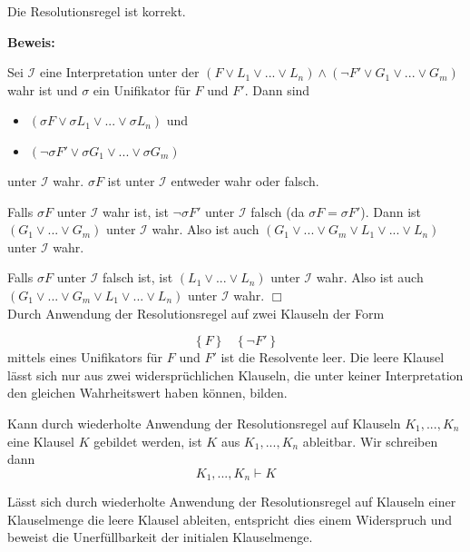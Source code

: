 \begin{leftbar}
\begin{satz}
  Die Resolutionsregel ist korrekt.
\end{satz}
\end{leftbar}
\noindent
\textbf{Beweis:}

Sei $\mathcal{I}$ eine Interpretation unter der $(F \vee L_1 \vee ... \vee L_n) \wedge (\neg F' \vee G_1 \vee ... \vee G_m)$ wahr ist und $\sigma$ ein Unifikator für $F$ und $F'$. Dann sind

\begin{itemize}
\item $(\sigma F \vee \sigma L_1 \vee ... \vee \sigma L_n)$ und
\item $(\neg \sigma F' \vee \sigma G_1 \vee ... \vee \sigma G_m)$
\end{itemize}
unter $\mathcal{I}$ wahr. $\sigma F$ ist unter $\mathcal{I}$ entweder wahr oder falsch.

Falls $\sigma F$ unter $\mathcal{I}$ wahr ist, ist $\neg \sigma F'$ unter $\mathcal{I}$ falsch (da $\sigma F = \sigma F'$). Dann ist $(G_1 \vee ... \vee G_m)$ unter $\mathcal{I}$ wahr. Also ist auch $(G_1 \vee ... \vee G_m \vee L_1 \vee ... \vee L_n)$ unter $\mathcal{I}$ wahr.

Falls $\sigma F$ unter $\mathcal{I}$ falsch ist, ist $(L_1 \vee ... \vee L_n)$ unter $\mathcal{I}$ wahr. Also ist auch $(G_1 \vee ... \vee G_m \vee L_1 \vee ... \vee L_n)$ unter $\mathcal{I}$ wahr.
\hfill $\Box$\\
\newline
\noindent
Durch Anwendung der Resolutionsregel auf zwei Klauseln der Form

\begin{equation}
  \left \{ F \right \} \; \; \; \left \{ \neg F' \right \}
\end{equation}
\noindent
mittels eines Unifikators für $F$ und $F'$ ist die Resolvente leer. Die leere Klausel lässt sich nur aus zwei widersprüchlichen Klauseln, die unter keiner Interpretation den gleichen Wahrheitswert haben können, bilden.

\begin{leftbar}
  \begin{definition}[Ableitbarkeit]
    \newline
    Kann durch wiederholte Anwendung der Resolutionsregel auf Klauseln $K_1,...,K_n$ eine Klausel $K$ gebildet werden, ist $K$ aus $K_1,...,K_n$ ableitbar. Wir schreiben dann
    \begin{equation}
      K_1,...,K_n \vdash K
    \end{equation}
  \end{definition}
\end{leftbar}
\noindent
Lässt sich durch wiederholte Anwendung der Resolutionsregel auf Klauseln einer Klauselmenge die leere Klausel ableiten, entspricht dies einem Widerspruch und beweist die Unerfüllbarkeit der initialen Klauselmenge.

